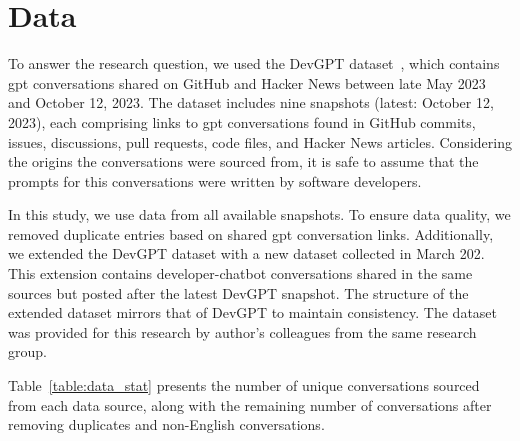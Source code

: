 \chapter{Data}\label{sec:data}
To answer the research question, we used the DevGPT dataset~\cite{devgpt}, which contains \acrshort{gpt} conversations shared on GitHub and Hacker News between late May 2023 and October 12, 2023. The dataset includes nine snapshots (latest: October 12, 2023), each comprising links to \acrshort{gpt} conversations found in GitHub commits, issues, discussions, pull requests, code files, and Hacker News articles. Considering the origins the conversations were sourced from, it is safe to assume that the prompts for this conversations were written by software developers.

In this study, we use data from all available snapshots. To ensure data quality, we removed duplicate entries based on shared \acrshort{gpt} conversation links. Additionally, we extended the DevGPT dataset with a new dataset collected in March 202. This extension contains developer-chatbot conversations shared in the same sources but posted after the latest DevGPT snapshot. The structure of the extended dataset mirrors that of DevGPT to maintain consistency. The dataset was provided for this research by author's colleagues from the same research group.

Table~\ref{table:data_stat} presents the number of unique conversations sourced from each data source, along with the remaining number of conversations after removing duplicates and non-English conversations.

\begin{table}[h]
    \centering
    \caption{Number of conversations collected from different sources after all the duplicates (DR) and non-English conversations (NE) were removed from the data.}
    \label{table:data_stat}
\end{table}

